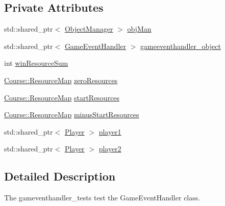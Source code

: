 \subsection*{Private Attributes}
\begin{DoxyCompactItemize}
\item 
std\-::shared\-\_\-ptr$<$ \hyperlink{classGame_1_1ObjectManager}{Object\-Manager} $>$ \hyperlink{classdefault__gameeventhandler_acdd2478cf08de20b164b66ec103b7de1}{obj\-Man}
\item 
std\-::shared\-\_\-ptr$<$ \hyperlink{classGame_1_1GameEventHandler}{Game\-Event\-Handler} $>$ \hyperlink{classdefault__gameeventhandler_aefeb6dad4999cfc75af77e989043815c}{gameeventhandler\-\_\-object}
\item 
int \hyperlink{classdefault__gameeventhandler_a1ac8cedd79456662813fa56454501d88}{win\-Resource\-Sum}
\item 
\hyperlink{namespaceCourse_ab9a46ed9cd00485e318e5731ea2f78d9}{Course\-::\-Resource\-Map} \hyperlink{classdefault__gameeventhandler_a09d45dc3340790f910f4c42a200d5fbf}{zero\-Resources}
\item 
\hyperlink{namespaceCourse_ab9a46ed9cd00485e318e5731ea2f78d9}{Course\-::\-Resource\-Map} \hyperlink{classdefault__gameeventhandler_aa6df2098d736982fb23603eff7edcf02}{start\-Resources}
\item 
\hyperlink{namespaceCourse_ab9a46ed9cd00485e318e5731ea2f78d9}{Course\-::\-Resource\-Map} \hyperlink{classdefault__gameeventhandler_aa22ed639196433fa97c3c53501660910}{minus\-Start\-Resources}
\item 
std\-::shared\-\_\-ptr$<$ \hyperlink{classGame_1_1Player}{Player} $>$ \hyperlink{classdefault__gameeventhandler_a25fc82697d08eb776919e8286bd2db5d}{player1}
\item 
std\-::shared\-\_\-ptr$<$ \hyperlink{classGame_1_1Player}{Player} $>$ \hyperlink{classdefault__gameeventhandler_a638662f415f3dc219ebb727b546734ba}{player2}
\end{DoxyCompactItemize}


\subsection{Detailed Description}
The gameventhandler\-\_\-tests test the Game\-Event\-Handler class. 

